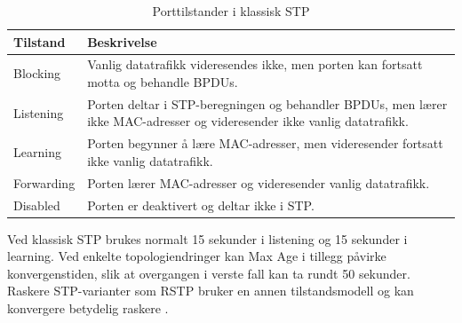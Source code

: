 \begin{table}[H]

\centering

\caption{Porttilstander i klassisk STP}

\label{tab:stp-porttilstander}

\small

\renewcommand{\arraystretch}{1.25}

\begin{tabular}{@{}ll@{}}

\toprule

\parbox[t]{0.22\textwidth}{\textbf{Tilstand}} & \parbox[t]{0.66\textwidth}{\textbf{Beskrivelse}} \\

\midrule

\parbox[t]{0.22\textwidth}{Blocking} & \parbox[t]{0.66\textwidth}{\raggedright Vanlig datatrafikk videresendes ikke, men porten kan fortsatt motta og behandle BPDUs.} \\

\addlinespace

\parbox[t]{0.22\textwidth}{Listening} & \parbox[t]{0.66\textwidth}{\raggedright Porten deltar i STP-beregningen og behandler BPDUs, men lærer ikke MAC-adresser og videresender ikke vanlig datatrafikk.} \\

\addlinespace

\parbox[t]{0.22\textwidth}{Learning} & \parbox[t]{0.66\textwidth}{\raggedright Porten begynner å lære MAC-adresser, men videresender fortsatt ikke vanlig datatrafikk.} \\

\addlinespace

\parbox[t]{0.22\textwidth}{Forwarding} & \parbox[t]{0.66\textwidth}{\raggedright Porten lærer MAC-adresser og videresender vanlig datatrafikk.} \\

\addlinespace

\parbox[t]{0.22\textwidth}{Disabled} & \parbox[t]{0.66\textwidth}{\raggedright Porten er deaktivert og deltar ikke i STP.} \\

\bottomrule

\end{tabular}

\end{table}

\noindent

Ved klassisk STP brukes normalt 15 sekunder i listening og 15 sekunder i learning. Ved enkelte topologiendringer kan Max Age i tillegg påvirke konvergenstiden, slik at overgangen i verste fall kan ta rundt 50 sekunder. Raskere STP-varianter som RSTP bruker en annen tilstandsmodell og kan konvergere betydelig raskere \cite{forsvaret_nettverk_rolle1,cisco_stp_3850}.

